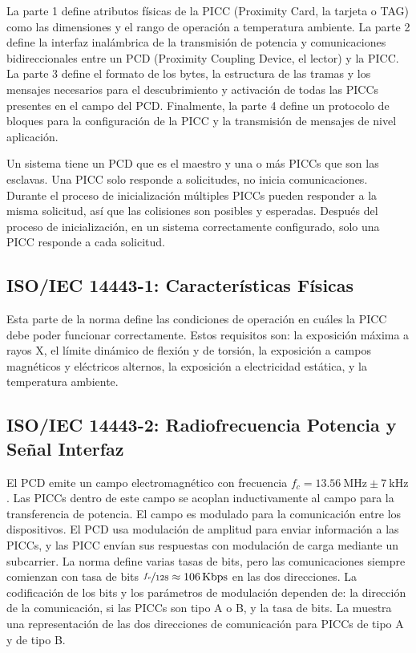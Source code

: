 \documentclass[a4paper, twoside, 11pt]{report}
\begin{document}
La parte 1 define atributos físicas de la PICC (Proximity Card, la tarjeta o TAG) como las dimensiones y el rango de operación a temperatura ambiente. La parte 2 define la interfaz inalámbrica de la transmisión de potencia y comunicaciones bidireccionales entre un PCD (Proximity Coupling Device, el lector) y la PICC. La parte 3 define el formato de los bytes, la estructura de las tramas y los mensajes necesarios para el descubrimiento y activación de todas las PICCs presentes en el campo del PCD. Finalmente, la parte 4 define un protocolo de bloques para la configuración de la PICC y la transmisión de mensajes de nivel aplicación.

Un sistema tiene un PCD que es el maestro y una o más PICCs que son las esclavas. Una PICC solo responde a solicitudes, no inicia comunicaciones. Durante el proceso de inicialización múltiples PICCs pueden responder a la misma solicitud, así que las colisiones son posibles y esperadas. Después del proceso de inicialización, en un sistema correctamente configurado, solo una PICC responde a cada solicitud.

\FloatBarrier
\subsection{ISO/IEC 14443-1: \large{Características Físicas}}

Esta parte de la norma define las condiciones de operación en cuáles la PICC debe poder funcionar correctamente. Estos requisitos son: la exposición máxima a rayos X, el límite dinámico de flexión y de torsión, la exposición a campos magnéticos y eléctricos alternos, la exposición a electricidad estática, y la temperatura ambiente\cite{iso14443-1}.

\FloatBarrier
\subsection{ISO/IEC 14443-2: \large{Radiofrecuencia Potencia y Señal Interfaz}}
\label{sec:introduction_iso14443-2}

El PCD emite un campo electromagnético con frecuencia $f_c = \SI{13.56}{\mega\hertz} \pm \SI{7}{\kilo\hertz}$. Las PICCs dentro de este campo se acoplan inductivamente al campo para la transferencia de potencia. El campo es modulado para la comunicación entre los dispositivos. El PCD usa modulación de amplitud para enviar información a las PICCs, y las PICC envían sus respuestas con modulación de carga mediante un subcarrier. La norma define varias tasas de bits, pero las comunicaciones siempre comienzan con tasa de bits $\nicefrac{f_c}{128} \approx \SI{106}{Kbps}$ en las dos direcciones. La codificación de los bits y los parámetros de modulación dependen de: la dirección de la comunicación, si las PICCs son tipo A o B, y la tasa de bits. La  muestra una representación de las dos direcciones de comunicación para PICCs de tipo A y de tipo B.
\end{document}
